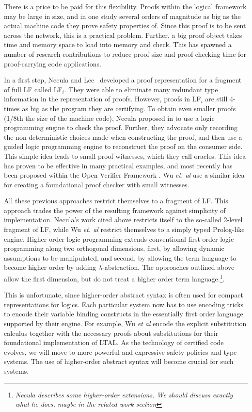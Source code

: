 \documentclass{acmconf}
\newcommand{\ednote}[1]{\footnote{\it #1}}
\begin{document}
There is a price to be paid for this flexibility. Proofs within the
logical framework may be large in size, and in one study
several orders of magnitude as big as the actual machine code they
prove safety properties of. Since this proof is to be sent across the
network, this is a practical problem. Further, a big proof object
takes time and memory space to load into memory and check. This has
spawned a number of research contributions to reduce proof size and
proof checking time for proof-carrying code applications.

In a first step, Necula and Lee~\cite{Necula98lics} developed a proof
representation for a fragment of full LF called LF$_i$. They were able
to eliminate many redundant type information in the representation of
proofs. However, proofs in LF$_i$ are still 4-times as big as the
program they are certifying. To obtain even smaller proofs (1/8th the
size of the machine code), Necula proposed in \cite{Necula+01:oracle}
to use a logic programming engine to check the proof. Further, they
advocate only recording the non-deterministic choices made when
constructing the proof, and then use a guided logic programming engine
to reconstruct the proof on the consumer side. This simple idea leads
to small proof witnesses, which they call oracles. This idea has
proven to be effective in many practical examples, and most recently
has been proposed within the Open Verifier Framework
\cite{Necula?}. Wu {\em{et. al}} \cite{Appel:PPDP03} use a similar
idea for creating a foundational proof checker with small witnesses.

All these previous approaches restrict themselves to a fragment of LF.
This approach trades the power of the resulting framework against
simplicity of implementation. Necula's work cited above restricts
itself to the so-called 2-level fragment of LF, while Wu {\em et. al}
restrict themselves to a simply typed Prolog-like engine. Higher order
logic programming extends conventional first order logic programming
along two orthogonal dimensions, first, by allowing dynamic
assumptions to be manipulated, and second, by allowing the term
language to become higher order by adding $\lambda$-abstraction. The
approaches outlined above allow the first dimension, but do not treat
a higher order term language.\ednote{Necula describes some
higher-order extensions. We should discuss exactly what he does, maybe
in the related work section}.

This is unfortunate, since higher-order abstract syntax is often used
for compact representations for logics. Each particular system now has
to use encoding tricks to encode their variable binding constructs in
the essentially first order language supported by their engine. For
example, Wu {\em et al}\cite{Appel:PPDP03} encode the explicit
substitution calculus \cite{Abadi:POPL90} together with the necessary
proofs about substitutions for their foundational implementation of
LTAL. As the technology of certified code evolves, we will move to
more powerful and expressive safety policies and type systems. The use
of higher-order abstract syntax will become crucial for such systems.
\end{document}

